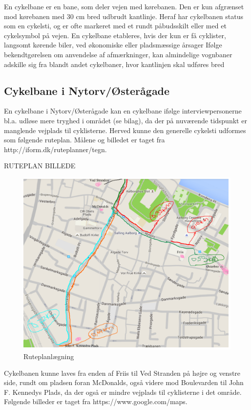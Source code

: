 En cykelbane er en bane, som deler vejen med kørebanen. Den er kun afgrænset mod kørebanen med 30 cm bred udbrudt kantlinje. Heraf har cykelbanen status som en cykelsti, og er ofte markeret med et rundt påbudsskilt eller med et cykelsymbol på vejen. En cykelbane etableres, hvis der kun er få cyklister, langsomt kørende biler, ved økonomiske eller pladsmæssige årsager %
  Ifølge bekendtgørelsen om anvendelse af afmærkninger, kan almindelige vognbaner adskille sig fra blandt andet cykelbaner, hvor kantlinjen skal udføres bred %

\subsection{Cykelbane i Nytorv/Østerågade}
En cykelbane i Nytorv/Østerågade kan en cykelbane ifølge interviewpersonerne bl.a. udløse mere tryghed i området (se bilag), da der på nuværende tidspunkt er manglende vejplads til cyklisterne. Herved kunne den generelle cykelsti udformes som følgende ruteplan. Målene og billedet er taget fra http://iform.dk/ruteplanner/tegn.

RUTEPLAN BILLEDE
 \begin{figure}[htbp]
   \centering
   \begin{adjustbox}{max width=\textwidth}
     \includegraphics{figures/Billederogfigur/ruteplanlaegning.png}
  \end{adjustbox}
   \caption{Ruteplanlægning}
    \label{fig:ruteplan}
 \end{figure}
Cykelbanen kunne laves fra enden af Friis til Ved Stranden på højre og venstre side, rundt om pladsen foran McDonalds, også videre mod Boulevarden til John F. Kennedys Plads, da der også er mindre vejplads til cyklisterne i det område. Følgende billeder er taget fra https://www.google.com/maps.

